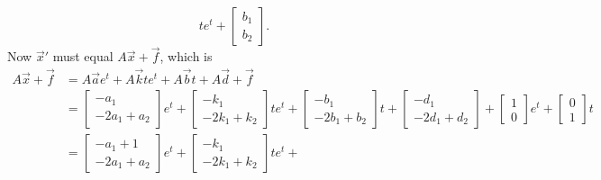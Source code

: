 \documentclass{ximera}
\begin{document}
\begin{exampleSol}
\begin{equation*}
        t e^{t} +
        \begin{bmatrix}
            b_1 \\ 
            b_2
        \end{bmatrix} .
    \end{equation*}
    Now ${\vec{x}}'$ must equal $A\vec{x} + \vec{f}$, which is
    \begin{equation*}
        \begin{split}
            A \vec{x} + \vec{f} &= A \vec{a} e^{t} + A \vec{k} t e^{t} + A \vec{b} t + A \vec{d} + \vec{f} \\
            & =
            \begin{bmatrix}
                -a_1 \\ 
                -2a_1+a_2
            \end{bmatrix}
            e^{t} +
            \begin{bmatrix}
                -k_1 \\ 
                -2k_1+k_2
            \end{bmatrix}
            t e^{t} +
            \begin{bmatrix}
                -b_1 \\ 
                -2b_1+b_2
            \end{bmatrix}
            t +
            \begin{bmatrix}
                -d_1 \\ 
                -2d_1+d_2
            \end{bmatrix}
            +
            \begin{bmatrix}
                1 \\ 
                0
            \end{bmatrix} 
            e^t +
            \begin{bmatrix}
                0 \\ 
                1
            \end{bmatrix} 
            t \\
            &=
            \begin{bmatrix}
                -a_1+1 \\ 
                -2a_1+a_2
            \end{bmatrix}
            e^{t} +
            \begin{bmatrix}
                -k_1 \\ 
                -2k_1+k_2
            \end{bmatrix}
            t e^{t} +

\end{split}
\end{equation*}
\end{exampleSol}
\end{document}
